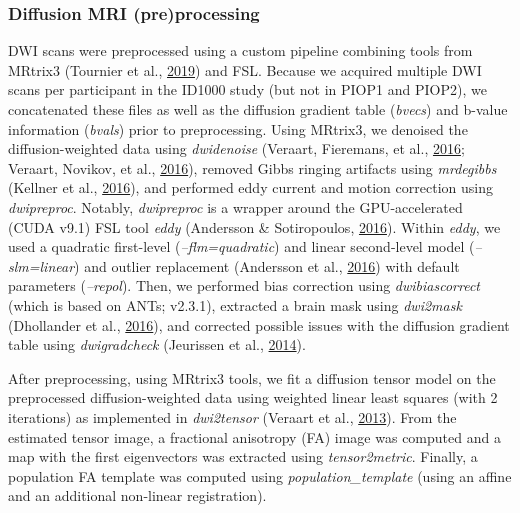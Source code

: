 \documentclass[11pt,american,a4paper,oneside,]{memoir} %
\begin{document}
\hypertarget{diffusion-mri-preprocessing}{%
\subsubsection{Diffusion MRI (pre)processing}\label{diffusion-mri-preprocessing}}

DWI scans were preprocessed using a custom pipeline combining tools from MRtrix3 (Tournier et al., \protect\hyperlink{ref-Tournier2019-hh}{2019}) and FSL. Because we acquired multiple DWI scans per participant in the ID1000 study (but not in PIOP1 and PIOP2), we concatenated these files as well as the diffusion gradient table (\emph{bvecs}) and b-value information (\emph{bvals}) prior to preprocessing. Using MRtrix3, we denoised the diffusion-weighted data using \emph{dwidenoise} (Veraart, Fieremans, et al., \protect\hyperlink{ref-Veraart2016-zi}{2016}; Veraart, Novikov, et al., \protect\hyperlink{ref-Veraart2016-rv}{2016}), removed Gibbs ringing artifacts using \emph{mrdegibbs} (Kellner et al., \protect\hyperlink{ref-Kellner2016-xb}{2016}), and performed eddy current and motion correction using \emph{dwipreproc}. Notably, \emph{dwipreproc} is a wrapper around the GPU-accelerated (CUDA v9.1) FSL tool \emph{eddy} (Andersson \& Sotiropoulos, \protect\hyperlink{ref-Andersson2016-pg}{2016}). Within \emph{eddy}, we used a quadratic first-level (\emph{--flm=quadratic}) and linear second-level model (\emph{--slm=linear}) and outlier replacement (Andersson et al., \protect\hyperlink{ref-Andersson2016-nm}{2016}) with default parameters (\emph{--repol}). Then, we performed bias correction using \emph{dwibiascorrect} (which is based on ANTs; v2.3.1), extracted a brain mask using \emph{dwi2mask} (Dhollander et al., \protect\hyperlink{ref-Dhollander2016-dx}{2016}), and corrected possible issues with the diffusion gradient table using \emph{dwigradcheck} (Jeurissen et al., \protect\hyperlink{ref-Jeurissen2014-cd}{2014}).

After preprocessing, using MRtrix3 tools, we fit a diffusion tensor model on the preprocessed diffusion-weighted data using weighted linear least squares (with 2 iterations) as implemented in \emph{dwi2tensor} (Veraart et al., \protect\hyperlink{ref-Veraart2013-ya}{2013}). From the estimated tensor image, a fractional anisotropy (FA) image was computed and a map with the first eigenvectors was extracted using \emph{tensor2metric}. Finally, a population FA template was computed using \emph{population\_template} (using an affine and an additional non-linear registration).
\end{document}
